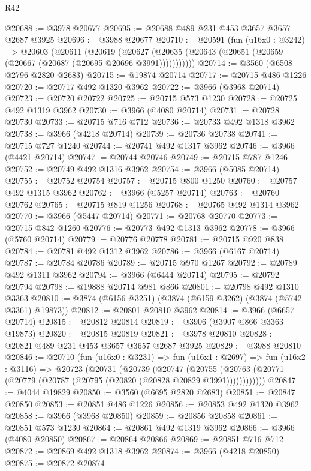 \begin{lexlean}{R42}
\begin{coremodule}
@20688 := @3978 @20677
@20695 := @20688 @489 @231 @453 @3657 @3657 @2687 @3925
@20696 := @3988 @20677
@20710 := @20591
    (fun (u16x0 : @3242) =>
    @20603
      (@20611
        (@20619
          (@20627 (@20635 (@20643 (@20651 (@20659 (@20667 (@20687 (@20695 @20696 @3991)))))))))))
@20714 := @3560 (@6508 @2796 @2820 @2683)
@20715 := @19874 @20714
@20717 := @20715 @486 @1226
@20720 := @20717 @492 @1320 @3962
@20722 := @3966 (@3968 @20714)
@20723 := @20720 @20722
@20725 := @20715 @573 @1230
@20728 := @20725 @492 @1319 @3962
@20730 := @3966 (@4080 @20714)
@20731 := @20728 @20730
@20733 := @20715 @716 @712
@20736 := @20733 @492 @1318 @3962
@20738 := @3966 (@4218 @20714)
@20739 := @20736 @20738
@20741 := @20715 @727 @1240
@20744 := @20741 @492 @1317 @3962
@20746 := @3966 (@4421 @20714)
@20747 := @20744 @20746
@20749 := @20715 @787 @1246
@20752 := @20749 @492 @1316 @3962
@20754 := @3966 (@5085 @20714)
@20755 := @20752 @20754
@20757 := @20715 @800 @1250
@20760 := @20757 @492 @1315 @3962
@20762 := @3966 (@5257 @20714)
@20763 := @20760 @20762
@20765 := @20715 @819 @1256
@20768 := @20765 @492 @1314 @3962
@20770 := @3966 (@5447 @20714)
@20771 := @20768 @20770
@20773 := @20715 @842 @1260
@20776 := @20773 @492 @1313 @3962
@20778 := @3966 (@5760 @20714)
@20779 := @20776 @20778
@20781 := @20715 @920 @838
@20784 := @20781 @492 @1312 @3962
@20786 := @3966 (@6167 @20714)
@20787 := @20784 @20786
@20789 := @20715 @970 @1267
@20792 := @20789 @492 @1311 @3962
@20794 := @3966 (@6444 @20714)
@20795 := @20792 @20794
@20798 := @19888 @20714 @981 @866
@20801 := @20798 @492 @1310 @3363
@20810 := @3874 (@6156 @3251) (@3874 (@6159 @3262) (@3874 (@5742 @3361) @19873))
@20812 := @20801 @20810 @3962
@20814 := @3966 (@6657 @20714)
@20815 := @20812 @20814
@20819 := @3906 (@3907 @866 @3363 @19873)
@20820 := @20815 @20819
@20821 := @3978 @20810
@20828 := @20821 @489 @231 @453 @3657 @3657 @2687 @3925
@20829 := @3988 @20810
@20846 := @20710
    (fun (u16x0 : @3231) =>
    fun (u16x1 : @2697) =>
    fun (u16x2 : @3116) =>
    @20723
      (@20731
        (@20739
          (@20747
            (@20755 (@20763 (@20771 (@20779 (@20787 (@20795 (@20820 (@20828 @20829 @3991))))))))))))
@20847 := @4044 @19829
@20850 := @3560 (@6695 @2820 @2683)
@20851 := @20847 @20850
@20853 := @20851 @486 @1226
@20856 := @20853 @492 @1320 @3962
@20858 := @3966 (@3968 @20850)
@20859 := @20856 @20858
@20861 := @20851 @573 @1230
@20864 := @20861 @492 @1319 @3962
@20866 := @3966 (@4080 @20850)
@20867 := @20864 @20866
@20869 := @20851 @716 @712
@20872 := @20869 @492 @1318 @3962
@20874 := @3966 (@4218 @20850)
@20875 := @20872 @20874

\end{coremodule}
\end{lexlean}
